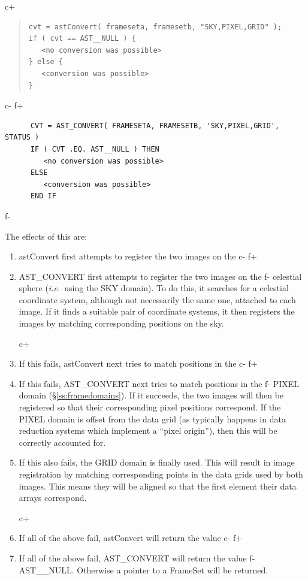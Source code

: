\documentclass[twoside,11pt]{article}
\newcommand{\secref}[1]{\S\ref{#1}}
\newcommand{\secref}[1]{\ref{#1}}
\begin{document}
c+
\begin{quote}
\small
\begin{verbatim}
cvt = astConvert( frameseta, framesetb, "SKY,PIXEL,GRID" );
if ( cvt == AST__NULL ) {
   <no conversion was possible>
} else {
   <conversion was possible>
}
\end{verbatim}
\normalsize
\end{quote}
c-
f+
\small
\begin{verbatim}
      CVT = AST_CONVERT( FRAMESETA, FRAMESETB, 'SKY,PIXEL,GRID', STATUS )
      IF ( CVT .EQ. AST__NULL ) THEN
         <no conversion was possible>
      ELSE
         <conversion was possible>
      END IF
\end{verbatim}
\normalsize
f-

The effects of this are:

\begin{enumerate}
c+
\item astConvert first attempts to register the two images on the
c-
f+
\item AST\_CONVERT first attempts to register the two images on the
f-
celestial sphere ({\em{i.e.}}\ using the SKY domain). To do this, it
searches for a celestial coordinate system, although not necessarily
the same one, attached to each image.  If it finds a suitable pair of
coordinate systems, it then registers the images by matching
corresponding positions on the sky.

c+
\item If this fails, astConvert next tries to match positions in the
c-
f+
\item If this fails, AST\_CONVERT next tries to match positions in the
f-
PIXEL domain (\secref{ss:framedomains}). If it succeeds, the two
images will then be registered so that their corresponding pixel
positions correspond. If the PIXEL domain is offset from the data grid
(as typically happens in data reduction systems which implement a
``pixel origin''), then this will be correctly accounted for.

\item If this also fails, the GRID domain is finally used. This will
result in image registration by matching corresponding points in the
data grids used by both images. This means they will be
aligned so that the first element their data arrays correspond.

c+
\item If all of the above fail, astConvert will return the value
c-
f+
\item If all of the above fail, AST\_CONVERT will return the value
f-
AST\_\_NULL. Otherwise a pointer to a FrameSet will be returned.
\end{enumerate}
\end{document}
